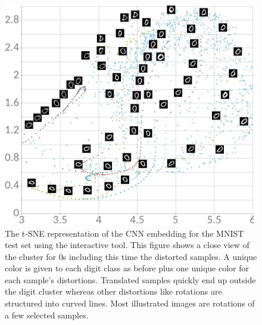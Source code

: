 \documentclass[a4paper,12pt]{report}
\begin{document}
\begin{figure}[t]
    \centering
    \includegraphics[width=\textwidth]{thesis_figures/mnist_nda_tsne2.jpg}
    \caption{The t-SNE representation of the CNN embedding for the MNIST test set using the interactive tool.
    This figure shows a close view of the cluster for 0s including this time the distorted samples.
    A unique color is given to each digit class as before plus one unique color for each sample's distortions.
    Translated samples quickly end up outside the digit cluster whereas other distortions like rotations are structured into curved lines.
    Most illustrated images are rotations of a few selected samples.
    }
    \label{fig:mnist_nda_tsne2}
\end{figure}
\end{document}
